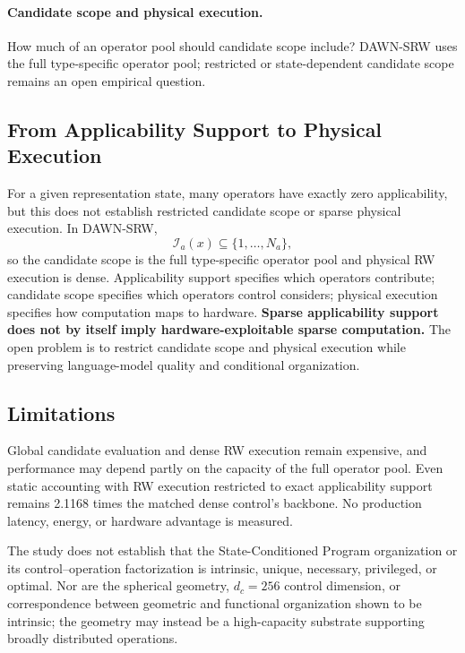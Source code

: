 \documentclass{article}
\newcommand{\DAWN}{DAWN-SRW}
\begin{document}
\paragraph{Candidate scope and physical execution.}
How much of an operator pool should candidate scope include? \DAWN{} uses the full
type-specific operator pool; restricted or state-dependent candidate scope
remains an open empirical question.

\subsection{From Applicability Support to Physical Execution}
\label{sec:future-execution}

For a given representation state, many operators have exactly zero
applicability, but this does not establish restricted candidate scope or sparse
physical execution. In \DAWN{},
\[
\mathcal{I}_a(x)\subseteq\{1,\ldots,N_a\},
\]
so the candidate scope is the full type-specific operator pool and physical RW
execution is dense. Applicability support specifies which operators contribute;
candidate scope specifies which operators control considers; physical execution
specifies how computation maps to hardware. \textbf{Sparse
applicability support does not by itself imply hardware-exploitable sparse
computation.} The open problem is to restrict candidate scope and physical
execution while preserving language-model quality and conditional organization.

\subsection{Limitations}

Global candidate evaluation and dense RW execution remain expensive,
and performance may depend partly on the capacity of the full operator pool.
Even static accounting with RW execution restricted to exact applicability
support remains 2.1168 times the matched dense control's backbone. No
production latency, energy, or hardware advantage is measured.

The study does not establish that the State-Conditioned Program organization or
its control--operation factorization is intrinsic, unique, necessary,
privileged, or optimal. Nor are the spherical geometry, \(d_c=256\) control
dimension, or correspondence between geometric and functional organization
shown to be intrinsic; the geometry may instead be a high-capacity substrate
supporting broadly distributed operations.
\end{document}
